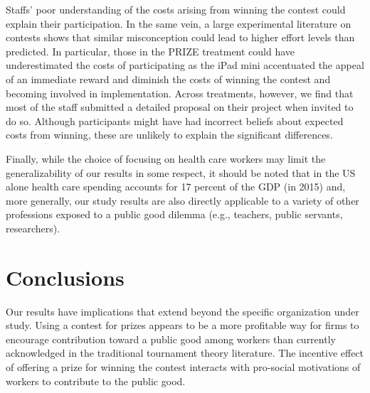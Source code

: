 \documentclass[11pt, titlepage]{article}
\begin{document}
Staffs' poor understanding of the costs arising from winning the contest
could explain their participation. In the same vein, a large
experimental literature on contests \citep{dechenaux2014survey} shows
that similar misconception could lead to higher effort levels than
predicted. In particular, those in the PRIZE treatment could have
underestimated the costs of participating as the iPad mini accentuated
the appeal of an immediate reward and diminish the costs of winning the
contest and becoming involved in implementation. Across treatments,
however, we find that most of the staff submitted a detailed proposal on
their project when invited to do so. Although participants might have
had incorrect beliefs about expected costs from winning, these are
unlikely to explain the significant differences.

Finally, while the choice of focusing on health care workers may limit
the generalizability of our results in some respect, it should be noted
that in the US alone health care spending accounts for 17 percent of the
GDP (in 2015) and, more generally, our study results are also directly
applicable to a variety of other professions exposed to a public good
dilemma (e.g., teachers, public servants, researchers).

\section{Conclusions}\label{conclusions}

Our results have implications that extend beyond the specific
organization under study. Using a contest for prizes appears to be a
more profitable way for firms to encourage contribution toward a public
good among workers than currently acknowledged in the traditional
tournament theory literature. The incentive effect of offering a prize
for winning the contest interacts with pro-social motivations of workers
to contribute to the public good.

\renewcommand\refname{References}

\end{document}
